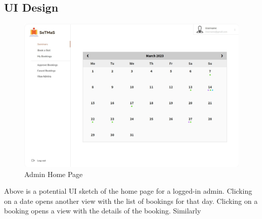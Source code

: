 \documentclass{article}
\begin{document}
\pagebreak
\subsection{UI Design}
\begin{figure}[h]
    \centering
    \includegraphics[width=\textwidth]{SeTMaS_HomeScreen_UI.jpeg}
    \caption{Admin Home Page}
    \label{fig:admin_home}
\end{figure}
Above is a potential UI sketch of the home page for a logged-in admin. Clicking on a date opens another view with the list of bookings for that day. Clicking on a booking opens a view with the details of the booking. Similarly 
\end{document}
